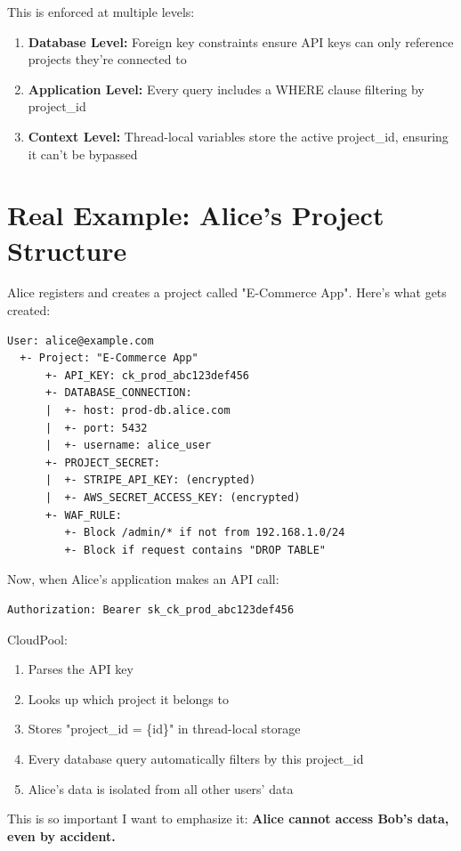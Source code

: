 \documentclass[11pt,a4paper]{report}
\begin{document}
This is enforced at multiple levels:

\begin{enumerate}
\item \textbf{Database Level:} Foreign key constraints ensure API keys can only reference projects they're connected to
\item \textbf{Application Level:} Every query includes a WHERE clause filtering by project\_id
\item \textbf{Context Level:} Thread-local variables store the active project\_id, ensuring it can't be bypassed

\end{enumerate}

\section{Real Example: Alice's Project Structure}


Alice registers and creates a project called "E-Commerce App". Here's what gets created:

\begin{lstlisting}[language=text]
User: alice@example.com
  +- Project: "E-Commerce App"
      +- API_KEY: ck_prod_abc123def456
      +- DATABASE_CONNECTION: 
      |  +- host: prod-db.alice.com
      |  +- port: 5432
      |  +- username: alice_user
      +- PROJECT_SECRET:
      |  +- STRIPE_API_KEY: (encrypted)
      |  +- AWS_SECRET_ACCESS_KEY: (encrypted)
      +- WAF_RULE:
         +- Block /admin/* if not from 192.168.1.0/24
         +- Block if request contains "DROP TABLE"
\end{lstlisting}

Now, when Alice's application makes an API call:
\begin{lstlisting}[language=text]
Authorization: Bearer sk_ck_prod_abc123def456
\end{lstlisting}

CloudPool:
\begin{enumerate}
\item Parses the API key
\item Looks up which project it belongs to
\item Stores "project\_id = \{id\}" in thread-local storage
\item Every database query automatically filters by this project\_id
\item Alice's data is isolated from all other users' data

\end{enumerate}
This is so important I want to emphasize it: \textbf{Alice cannot access Bob's data, even by accident.}
\end{document}
